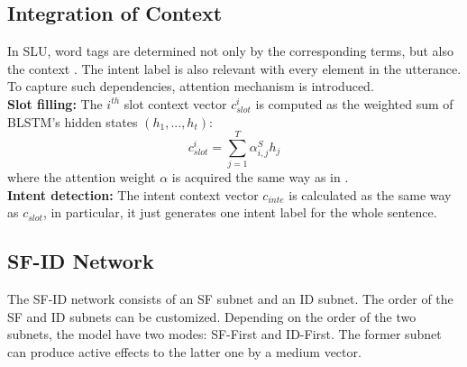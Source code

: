 \documentclass[11pt,a4paper]{article}
\begin{document}
\subsection{Integration of Context}
In SLU, word tags are determined not only by the corresponding terms, but also the context \cite{chen2016end}. The intent label is also relevant with every element in the utterance. To capture such dependencies, attention mechanism is introduced.\\
\textbf{Slot filling:} The $i^{th}$ slot context vector $c^i_{slot}$ is computed as the weighted sum of BLSTM's hidden states $(h_1,...,h_t)$:
\begin{equation} c^i_{slot}=\sum_{j=1}^T{\alpha^S_{i,j}h_j} \end{equation}
where the attention weight $\alpha$ is acquired the same way as in \cite{liu2016attention}.\\
\textbf{Intent detection:} The intent context vector $c_{inte}$ is calculated as the same way as $c_{slot}$, in particular, it just generates one intent label for the whole sentence.
\subsection{SF-ID Network}
The SF-ID network consists of an SF subnet and an ID subnet. The order of the SF and ID subnets can be customized. Depending on the order of the two subnets, the model have two modes: SF-First and ID-First. The former subnet can produce active effects to the latter one by a medium vector.
\end{document}
